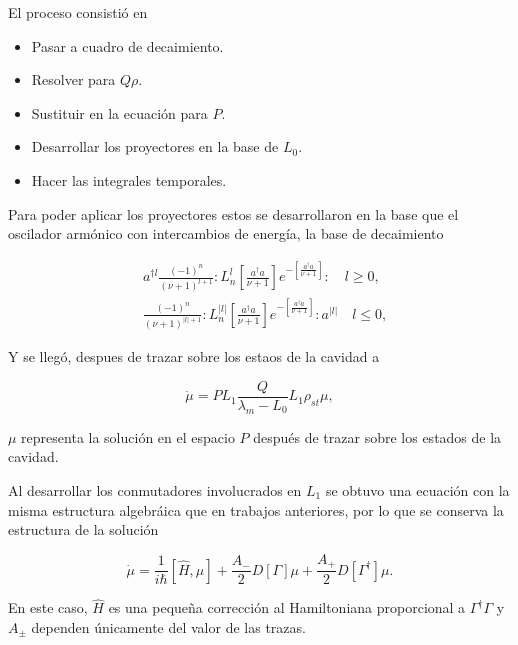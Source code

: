 \documentclass[10pt]{beamer}
\begin{document}
\begin{frame}

El proceso consistió en

\begin{itemize}
\item Pasar a cuadro de decaimiento.
\item Resolver para $Q\rho$.
\item Sustituir en la ecuación para $P$.
\item Desarrollar los proyectores en la base de $L_0$.
\item Hacer las integrales temporales.
\end{itemize}

\end{frame}

\begin{frame}
Para poder aplicar los proyectores estos se desarrollaron en la base que el oscilador armónico con intercambios de energía, la base de decaimiento

\begin{align*}
&a^{\dagger l}\frac{(-1)^n}{(\nu+1)^{l+1}}:L_n^l[\frac{a^\dagger a}{\nu+1}]e^{-[\frac{a^\dagger a}{\nu+1}]}:\quad l \geq 0, \\
&\frac{(-1)^n}{(\nu+1)^{|l|+1}}:L_n^{|l|}[\frac{a^\dagger a}{\nu+1}]e^{-[\frac{a^\dagger a}{\nu+1}]}:a^{|l|}\quad l \leq 0,
\end{align*}
\end{frame}

\begin{frame}
Y se llegó, despues de trazar sobre los estaos de la cavidad a

\begin{equation*}
\dot{\mu} = PL_1 \frac{Q}{\lambda_m-L_0}L_1\rho_{st}\mu,
\end{equation*}

$\mu$ representa la solución en el espacio $P$ después de trazar sobre los estados de la cavidad. 
\end{frame}

\begin{frame}

Al desarrollar los conmutadores involucrados en $L_1$ se obtuvo una ecuación con la misma estructura algebráica que en trabajos anteriores, por lo que se conserva la estructura de la solución

\begin{equation*}
\dot{\mu} = \frac{1}{i\hbar}[\hat{H},\mu] + \frac{A_-}{2}D[\Gamma]\mu + \frac{A_+}{2}D[\Gamma^\dagger]\mu.
\end{equation*}

En este caso, $\hat{H}$ es una pequeña corrección al Hamiltoniana proporcional a $\Gamma^\dagger \Gamma$ y $A_\pm$ dependen únicamente del valor de las trazas.

\end{frame}
\end{document}
